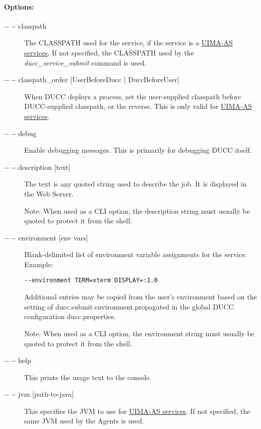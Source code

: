     \paragraph{Options:}
    \begin{description}

        \item[$--$classpath] The CLASSPATH used for the service, if the service is a
          \hyperref[sec:services.types]{UIMA-AS services}.  If not specified, the CLASSPATH used
          by the {\em ducc\_service\_submit} command is used.
          
        \item[$--$classpath\_order {[UserBeforeDucc | DuccBeforeUser]} ] When DUCC deploys a process,
          set the user-supplied classpath before DUCC-supplied classpath, or the reverse.  This is
          only valid for  \hyperref[sec:services.types]{UIMA-AS services}.
          
        \item[$--$debug ]
          Enable debugging messages. This is primarily for debugging DUCC itself. 
          
        \item[$--$description {[text]}] The text is any quoted string used to describe the job. It is
          displayed in the Web Server.

          Note: When used as a CLI option, the description string must usually be quoted to protect
          it from the shell.
    
        \item[$--$environment {[env vars]}] Blank-delimited list of environment variable
          assignments for the service. Example:
          \begin{verbatim}
--environment TERM=xterm DISPLAY=:1.0
          \end{verbatim}
             
          Additional entries may be copied from the user's environment based on the setting of
          ducc.submit.environment.propagated in the global DUCC configuration ducc.properties.

          Note: When used as a CLI option, the environment string must usually be
          quoted to protect it from the shell.
          
        \item[$--$help ] This prints the usage text to the console.

        \item[$--$jvm {[path-to-java]}] This specifies the JVM to use for 
          \hyperref[sec:services.types]{UIMA-AS services}. If not
          specified, the same JVM used by the Agents is used.  


\end{description}
